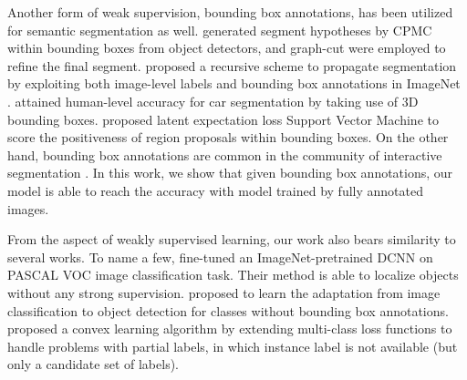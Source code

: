 Another form of weak supervision, bounding box annotations, has been utilized for semantic segmentation as well. \citet{xia2013semantic} generated segment hypotheses by CPMC \citep{carreira2012cpmc} within bounding boxes from object detectors, and graph-cut were employed to refine the final segment. \citet{guillaumin2014imagenet} proposed a recursive scheme to propagate segmentation by exploiting both image-level labels and bounding box annotations in ImageNet \citep{deng2009imagenet}. \citet{chen2014beat} attained human-level accuracy for car segmentation by taking use of 3D bounding boxes. \citet{zhu2014learning} proposed latent expectation loss Support Vector Machine to score the positiveness of region proposals within bounding boxes. On the other hand, bounding box annotations are common in the community of interactive segmentation \citep{lempitsky2009image, rother2004grabcut, WuMilcut}. In this work, we show that given bounding box annotations, our model is able to reach the accuracy with model trained by fully annotated images.

From the aspect of weakly supervised learning, our work also bears similarity to several works. To name a few, \citet{oquab2014weakly} fine-tuned an ImageNet-pretrained DCNN on PASCAL VOC image classification task. Their method is able to localize objects without any strong supervision. \citet{Hoffman14Lsda} proposed to learn the adaptation from image classification to object detection for classes without bounding box annotations. \citet{cour2011learning} proposed a convex learning algorithm by extending multi-class loss functions to handle problems with partial labels, in which instance label is not available (but only a candidate set of labels).
